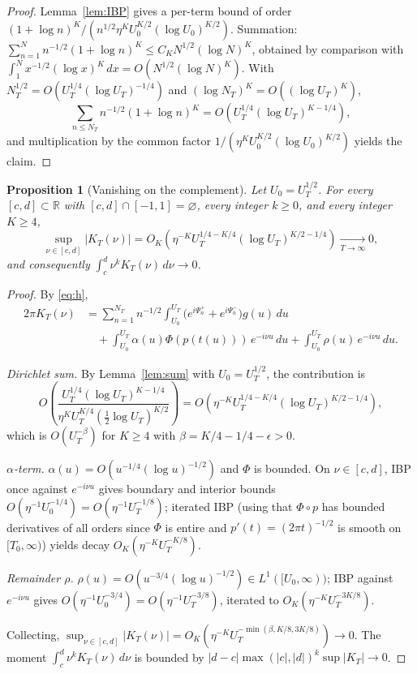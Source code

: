 \documentclass[11pt]{article}
\newtheorem{proposition}[theorem]{Proposition}
\theoremstyle{definition}
\theoremstyle{remark}
\begin{document}
\begin{proof}
Lemma~\ref{lem:IBP} gives a per-term bound of order
$(1+\log n)^K/(n^{1/2}\eta^K U_0^{K/2}(\log U_0)^{K/2})$.  Summation:
$\sum_{n=1}^{N}n^{-1/2}(1+\log n)^K\le C_K N^{1/2}(\log N)^K$, obtained
by comparison with $\int_1^N x^{-1/2}(\log x)^K\,dx=O(N^{1/2}(\log
N)^K)$.  With $N_T^{1/2}=O(U_T^{1/4}(\log U_T)^{-1/4})$ and
$(\log N_T)^K=O((\log U_T)^K)$,
\[
  \sum_{n\le N_T}n^{-1/2}(1+\log n)^K
  =O\!\left(U_T^{1/4}(\log U_T)^{K-1/4}\right),
\]
and multiplication by the common factor
$1/(\eta^K U_0^{K/2}(\log U_0)^{K/2})$ yields the claim.
\end{proof}

\begin{proposition}[Vanishing on the complement]\label{prop:van}
Let $U_0=U_T^{1/2}$.  For every $[c,d]\subset\mathbb{R}$ with
$[c,d]\cap[-1,1]=\varnothing$, every integer $k\ge 0$, and every
integer $K\ge 4$,
\[
  \sup_{\nu\in[c,d]}|K_T(\nu)|
  =O_K\!\left(\eta^{-K}U_T^{1/4-K/4}(\log U_T)^{K/2-1/4}\right)
  \xrightarrow[T\to\infty]{}0,
\]
and consequently $\int_c^d\nu^k K_T(\nu)\,d\nu\to 0$.
\end{proposition}

\begin{proof}
By \eqref{eq:h},
\begin{align*}
  2\pi K_T(\nu)
  &=\sum_{n=1}^{N_T}n^{-1/2}\!\int_{U_0}^{U_T}
    \bigl(e^{i\Psi_n^+}+e^{i\Psi_n^-}\bigr)g(u)\,du\\
  &\quad+\int_{U_0}^{U_T}\alpha(u)\Phi(p(t(u)))\,e^{-i\nu u}\,du
    +\int_{U_0}^{U_T}\rho(u)\,e^{-i\nu u}\,du.
\end{align*}

\emph{Dirichlet sum.}  By Lemma~\ref{lem:sum} with $U_0=U_T^{1/2}$, the
contribution is
\[
  O\!\left(\frac{U_T^{1/4}(\log U_T)^{K-1/4}}
    {\eta^K U_T^{K/4}(\tfrac12\log U_T)^{K/2}}\right)
  =O\!\left(\eta^{-K}U_T^{1/4-K/4}(\log U_T)^{K/2-1/4}\right),
\]
which is $O(U_T^{-\beta})$ for $K\ge 4$ with $\beta=K/4-1/4-\epsilon>0$.

\emph{$\alpha$-term.}  $\alpha(u)=O(u^{-1/4}(\log u)^{-1/2})$ and $\Phi$
is bounded.  On $\nu\in[c,d]$, IBP once against $e^{-i\nu u}$ gives
boundary and interior bounds $O(\eta^{-1}U_0^{-1/4})=O(\eta^{-1}
U_T^{-1/8})$; iterated IBP (using that $\Phi\circ p$ has bounded
derivatives of all orders since $\Phi$ is entire and
$p'(t)=(2\pi t)^{-1/2}$ is smooth on $[T_0,\infty)$) yields decay
$O_K(\eta^{-K}U_T^{-K/8})$.

\emph{Remainder $\rho$.}  $\rho(u)=O(u^{-3/4}(\log u)^{-1/2})\in
L^1([U_0,\infty))$; IBP against $e^{-i\nu u}$ gives
$O(\eta^{-1}U_0^{-3/4})=O(\eta^{-1}U_T^{-3/8})$, iterated to
$O_K(\eta^{-K}U_T^{-3K/8})$.

Collecting,
$\sup_{\nu\in[c,d]}|K_T(\nu)|=O_K(\eta^{-K}U_T^{-\min(\beta,K/8,3K/8)})
\to 0$.  The moment $\int_c^d\nu^k K_T(\nu)\,d\nu$ is bounded by
$|d-c|\max(|c|,|d|)^k\sup|K_T|\to 0$.
\end{proof}
\end{document}
